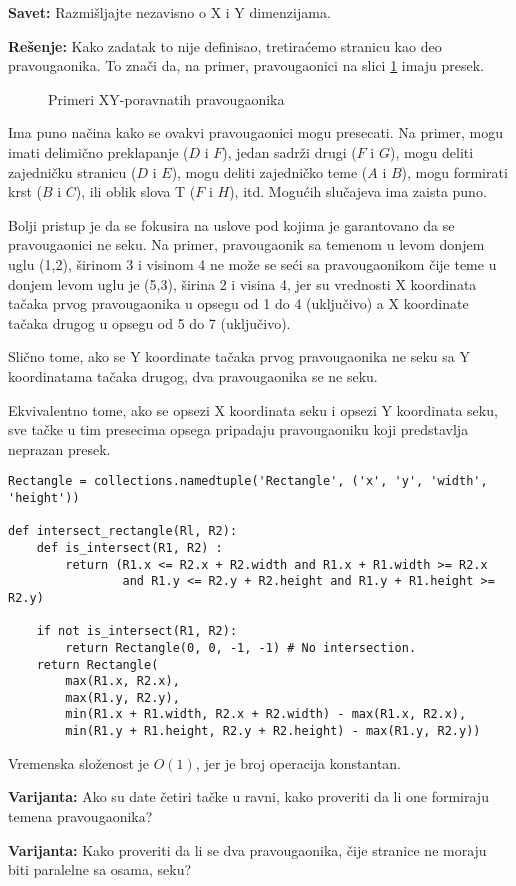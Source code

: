 \documentclass[11pt,a4paper]{article}
\begin{document}
\textbf{Savet:} Razmišljajte nezavisno o X i Y dimenzijama.

\textbf{Rešenje:} Kako zadatak to nije definisao, tretiraćemo stranicu kao deo
pravougaonika. To znači da, na primer, pravougaonici na slici
\ref{fig:rectangles} imaju presek.

\begin{figure}[hb]
\centering
{}
\caption{Primeri XY-poravnatih pravougaonika}
\label{fig:rectangles}
\end{figure}

Ima puno načina kako se ovakvi pravougaonici mogu presecati. Na primer, mogu
imati delimično preklapanje ($D$ i $F$), jedan sadrži drugi ($F$ i $G$), mogu
deliti zajedničku stranicu ($D$ i $E$), mogu deliti zajedničko teme ($A$ i $B$),
mogu formirati krst ($B$ i $C$), ili oblik slova T ($F$ i $H$), itd. Mogućih
slučajeva ima zaista puno.

Bolji pristup je da se fokusira na uslove pod kojima je garantovano da se
pravougaonici ne seku. Na primer, pravougaonik sa temenom u levom donjem uglu
(1,2), širinom 3 i visinom 4 ne može se seći sa pravougaonikom čije teme u
donjem levom uglu je (5,3), širina 2 i visina 4, jer su vrednosti X koordinata
tačaka prvog pravougaonika u opsegu od 1 do 4 (uključivo) a X koordinate tačaka
drugog u opsegu od 5 do 7 (uključivo).

Slično tome, ako se Y koordinate tačaka prvog pravougaonika ne seku sa Y
koordinatama tačaka drugog, dva pravougaonika se ne seku.

Ekvivalentno tome, ako se opsezi X koordinata seku i opsezi Y koordinata seku,
sve tačke u tim presecima opsega pripadaju pravougaoniku koji predstavlja
neprazan presek.

\begin{verbatim}
Rectangle = collections.namedtuple('Rectangle', ('x', 'y', 'width', 'height'))

def intersect_rectangle(Rl, R2): 
    def is_intersect(R1, R2) :
        return (R1.x <= R2.x + R2.width and R1.x + R1.width >= R2.x
                and R1.y <= R2.y + R2.height and R1.y + R1.height >= R2.y)

    if not is_intersect(R1, R2):
        return Rectangle(0, 0, -1, -1) # No intersection.
    return Rectangle(
        max(R1.x, R2.x),
        max(R1.y, R2.y),
        min(R1.x + R1.width, R2.x + R2.width) - max(R1.x, R2.x), 
        min(R1.y + R1.height, R2.y + R2.height) - max(R1.y, R2.y))
\end{verbatim}

Vremenska složenost je $O(1)$, jer je broj operacija konstantan.

\textbf{Varijanta:} Ako su date četiri tačke u ravni, kako proveriti da li one
formiraju temena pravougaonika?

\textbf{Varijanta:} Kako proveriti da li se dva pravougaonika, čije stranice ne
moraju biti paralelne sa osama, seku? 
\end{document}
